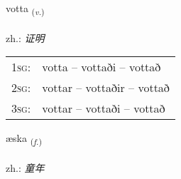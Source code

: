 \documentclass[frontgrid, backgrid]{flacards}\usepackage[]{graphicx}\usepackage[]{xcolor}
\begin{document}
\renewcommand{\flhead}{\vskip5pt \fboxsep=0pt {\small\bfseries\footnotesize Sagnorð | 动词}}
\renewcommand{\fcfoot}{\vskip5pt \fboxsep=0pt \hspace{2pt}{\small\bfseries\footnotesize 3K}}

\renewcommand{\blhead}{\vskip5pt {\small\bfseries\footnotesize Sagnorð | 动词 }}
\renewcommand{\bcfoot}{\vskip5pt \hspace{2pt}{\small\bfseries\footnotesize 3K}}


{votta \small{\textsubscript{(\textit{v.})}} \\[1ex] %
\textphonetic{[vɔhta]} \\
zh.: \emph{证明} \\  [2ex]
\renewcommand*{\arraystretch}{0.8}
\begin{tabular}{p{1cm}l}
\textsc{1sg}: & votta -- vottaði -- vottað \\ 
\textsc{2sg}: & vottar -- vottaðir -- vottað \\ 
\textsc{3sg}: & vottar -- vottaði -- vottað \\ 
\end{tabular}
}

\renewcommand{\flhead}{\vskip5pt \fboxsep=0pt {\small\bfseries\footnotesize Nafnorð | 名词}}
\renewcommand{\fcfoot}{\vskip5pt \fboxsep=0pt \hspace{2pt}{\small\bfseries\footnotesize 3K}}

\renewcommand{\blhead}{\vskip5pt {\small\bfseries\footnotesize Nafnorð | 名词 }}
\renewcommand{\bcfoot}{\vskip5pt \hspace{2pt}{\small\bfseries\footnotesize 3K}}


{æska \small{\textsubscript{(\textit{f.})}} \\[1ex] %
\textphonetic{[aiska]} \\
zh.: \emph{童年} \\  [2ex]
\renewcommand*{\arraystretch}{0.8}
}
\end{document}
